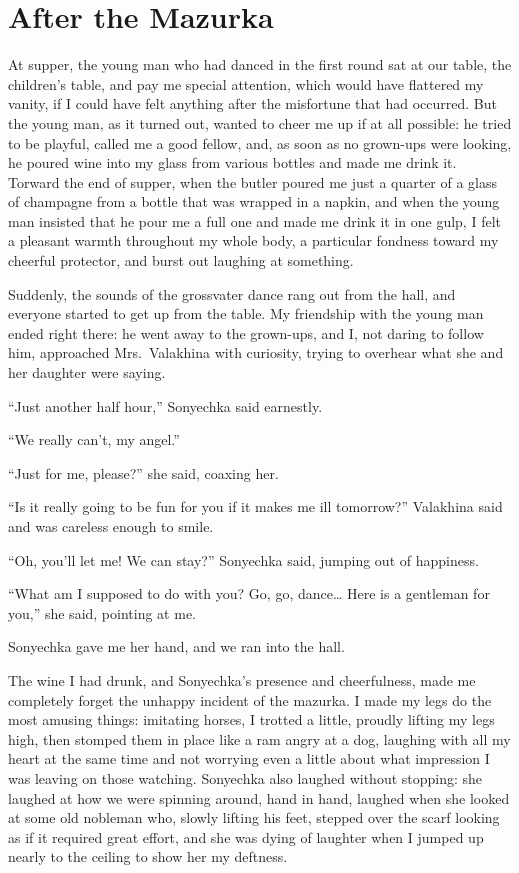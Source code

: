 \chapter{After the Mazurka} %

At supper, the young man who had danced in the first round sat at our table, the children's table, and pay me special attention, which would have flattered my vanity, if I could have felt anything after the misfortune that had occurred. But the young man, as it turned out, wanted to cheer me up if at all possible: he tried to be playful, called me a good fellow, and, as soon as no grown-ups were looking, he poured wine into my glass from various bottles and made me drink it. Torward the end of supper, when the butler poured me just a quarter of a glass of champagne from a bottle that was wrapped in a napkin, and when the young man insisted that he pour me a full one and made me drink it in one gulp, I felt a pleasant warmth throughout my whole body, a particular fondness toward my cheerful protector, and burst out laughing at something.

Suddenly, the sounds of the grossvater dance rang out from the hall, and everyone started to get up from the table. My friendship with the young man ended right there: he went away to the grown-ups, and I, not daring to follow him, approached Mrs.~Valakhina with curiosity, trying to overhear what she and her daughter were saying.

``Just another half hour,'' Sonyechka said earnestly. %

``We really can't, my angel.'' %

``Just for me, please?'' she said, coaxing her. %

``Is it really going to be fun for you if it makes me ill tomorrow?'' Valakhina said and was careless enough to smile. %

``Oh, you'll let me! We can stay?'' Sonyechka said, jumping out of happiness. %

``What am I supposed to do with you? Go, go, dance\ldots{} Here is a gentleman for you,'' she said, pointing at me. %

Sonyechka gave me her hand, and we ran into the hall.

The wine I had drunk, and Sonyechka's presence and cheerfulness, made me completely forget the unhappy incident of the mazurka. I made my legs do the most amusing things: imitating horses, I trotted a little, proudly lifting my legs high, then stomped them in place like a ram angry at a dog, laughing with all my heart at the same time and not worrying even a little about what impression I was leaving on those watching. Sonyechka also laughed without stopping: she laughed at how we were spinning around, hand in hand, laughed when she looked at some old nobleman who, slowly lifting his feet, stepped over the scarf looking as if it required great effort, and she was dying of laughter when I jumped up nearly to the ceiling to show her my deftness.

